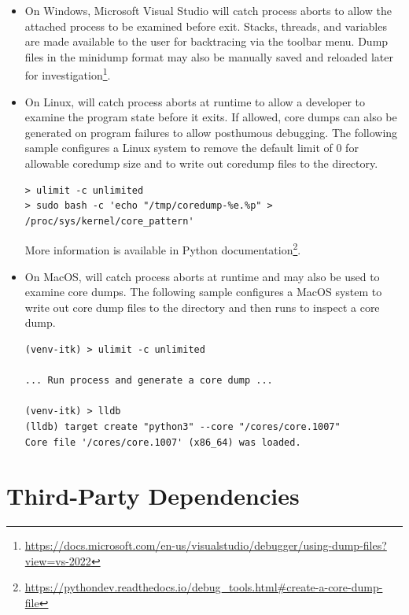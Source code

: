 \begin{itemize}

\item On Windows, Microsoft Visual Studio will catch process aborts
to allow the attached process to be examined before exit. Stacks, threads,
and variables are made available to the user for backtracing via the
 toolbar menu. Dump files in the minidump format may also
be manually saved and reloaded later for investigation\footnote{
\url{https://docs.microsoft.com/en-us/visualstudio/debugger/using-dump-files?view=vs-2022}}.

\item On Linux,  will catch process aborts at runtime to allow
a developer to examine the program state before it exits.
If allowed, core dumps can also be generated on program failures
to allow posthumous debugging. The following sample
configures a Linux system to remove the default limit of 0 for allowable
coredump size and to write out coredump files to the  directory.

\begin{verbatim}
> ulimit -c unlimited
> sudo bash -c 'echo "/tmp/coredump-%e.%p" > /proc/sys/kernel/core_pattern'
\end{verbatim}

More information is available in Python documentation\footnote{
\url{https://pythondev.readthedocs.io/debug_tools.html\#create-a-core-dump-file}}.

\item On MacOS,  will catch process aborts at runtime
and may also be used to examine core dumps. The following sample
configures a MacOS system to write out core dump files to the 
directory and then runs  to inspect a core dump.

\begin{verbatim}
(venv-itk) > ulimit -c unlimited

... Run process and generate a core dump ...

(venv-itk) > lldb
(lldb) target create "python3" --core "/cores/core.1007"
Core file '/cores/core.1007' (x86_64) was loaded.
\end{verbatim}

\end{itemize}


\section{Third-Party Dependencies}%
\label{sec:ThirdParty}%

